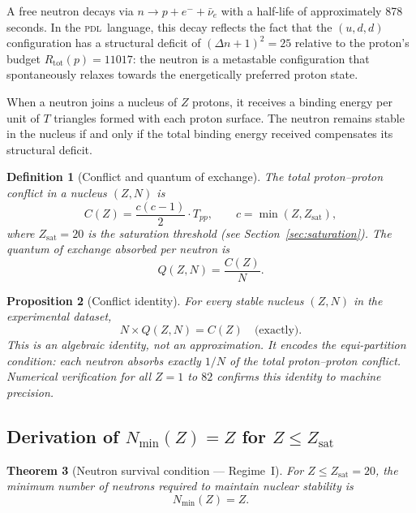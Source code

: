 \documentclass{article}
\newtheorem{theorem}{Theorem}[section]
\newtheorem{proposition}[theorem]{Proposition}
\newtheorem{definition}[theorem]{Definition}
\theoremstyle{remark}
\newcommand{\PDL}{\textsc{pdl}}
\newcommand{\Rtot}{R_{\mathrm{tot}}}
\newcommand{\Tpp}{T_{pp}}
\newcommand{\Zsat}{Z_{\mathrm{sat}}}
\newcommand{\Nmin}{N_{\min}}
\newcommand{\Deltanop}{\Delta n}
\begin{document}
A free neutron decays via $n \to p + e^- + \bar\nu_e$ with a half-life of approximately 878 seconds. In the \PDL\ language, this decay reflects the fact that the $(u,d,d)$ configuration has a structural deficit of $(\Deltanop+1)^2 = 25$ relative to the proton's budget $\Rtot(p) = 11017$: the neutron is a metastable configuration that spontaneously relaxes towards the energetically preferred proton state.

When a neutron joins a nucleus of $Z$ protons, it receives a binding energy per unit of $T$ triangles formed with each proton surface. The neutron remains stable in the nucleus if and only if the total binding energy received compensates its structural deficit.

\begin{definition}[Conflict and quantum of exchange]
\label{def:conflict}
The total proton--proton conflict in a nucleus $(Z,N)$ is
\begin{equation}
  C(Z) = \frac{c(c-1)}{2} \cdot \Tpp, \qquad c = \min(Z, \Zsat),
  \label{eq:conflict}
\end{equation}
where $\Zsat = 20$ is the saturation threshold (see Section~\ref{sec:saturation}). The quantum of exchange absorbed per neutron is
\begin{equation}
  Q(Z,N) = \frac{C(Z)}{N}.
  \label{eq:quantum}
\end{equation}
\end{definition}

\begin{proposition}[Conflict identity]
\label{prop:conflict_identity}
For every stable nucleus $(Z,N)$ in the experimental dataset,
\begin{equation}
  N \times Q(Z,N) = C(Z) \quad \text{(exactly)}.
  \label{eq:conflict_identity}
\end{equation}
This is an algebraic identity, not an approximation. It encodes the equi-partition condition: each neutron absorbs exactly $1/N$ of the total proton--proton conflict. Numerical verification for all $Z = 1$ to $82$ confirms this identity to machine precision.
\end{proposition}

\subsection[Derivation of Nmin(Z) = Z for Z <= Zsat]{Derivation of $\Nmin(Z) = Z$ for $Z \leq \Zsat$}

\begin{theorem}[Neutron survival condition --- Regime~I]
\label{thm:survival}
For $Z \leq \Zsat = 20$, the minimum number of neutrons required to maintain nuclear stability is
\begin{equation}
  \Nmin(Z) = Z.
  \label{eq:Nmin_I}
\end{equation}
\end{theorem}
\end{document}
